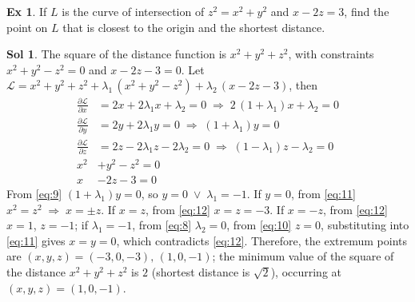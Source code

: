 \documentclass[12pt]{extarticle}
\newcommand{\ds}{\displaystyle}
\newcommand{\ie}{\;\Longrightarrow\;}
\newcommand{\orr}{\;\vee\;}
\theoremstyle{definition}
\newtheorem*{ex}{Ex}
\newtheorem*{sol}{Sol}
\newcommand{\pdiff}[2]{\frac{\partial #1}{\partial #2}}
\begin{document}
\begin{ex}
  If $L$ is the curve of intersection of $z^2 = x^2 + y^2$ and $x - 2z = 3$, find the point on $L$ that is closest to the origin and the shortest distance. 
\end{ex}

\begin{sol}
  The square of the distance function is $x^2 + y^2 + z^2$, with constraints $x^2 + y^2 - z^2 = 0$ and $x - 2z - 3 = 0$. Let $\ds\mathcal{L} = x^2 + y^2 + z^2 + \lambda_1\,(x^2 + y^2 - z^2) + \lambda_2\,(x - 2z - 3)$, then
  \begin{align}
    \pdiff{\mathcal{L}}{x} &= 2 x + 2\lambda_1 x + \lambda_2 = 0 \ie 2\,(1 + \lambda_1) x + \lambda_2 = 0\label{eq:8}\\
    \pdiff{\mathcal{L}}{y} &= 2 y + 2\lambda_1 y = 0 \ie (1 + \lambda_1)y = 0\label{eq:9} \\
    \pdiff{\mathcal{L}}{z} &= 2 z - 2\lambda_1 z - 2\lambda_2 = 0 \ie (1 - \lambda_1)z - \lambda_2 = 0\label{eq:10}\\
    x^2 &+ y^2 - z^2 = 0 \label{eq:11} \\
    x &- 2z - 3 = 0 \label{eq:12}
  \end{align}
  From \eqref{eq:9} $(1 + \lambda_1) y = 0$, so $y = 0\orr\lambda_1 = -1$. If $y = 0$, from \eqref{eq:11} $x^2 = z^2 \ie x = \pm z$. If $x = z$, from \eqref{eq:12} $x = z = -3$. If $x = -z$, from \eqref{eq:12} $x = 1$, $z = -1$; if $\lambda_1 = -1$, from \eqref{eq:8} $\lambda_2 = 0$, from \eqref{eq:10} $z = 0$, substituting into \eqref{eq:11} gives $x = y = 0$, which contradicts \eqref{eq:12}. Therefore, the extremum points are $(x, y, z) = (-3, 0, -3),\,(1, 0, -1)$; the minimum value of the square of the distance $x^2 + y^2 + z^2$ is $2$ (shortest distance is $\sqrt{2}$), occurring at $(x, y, z) = (1, 0, -1)$. 
\end{sol}
\end{document}
